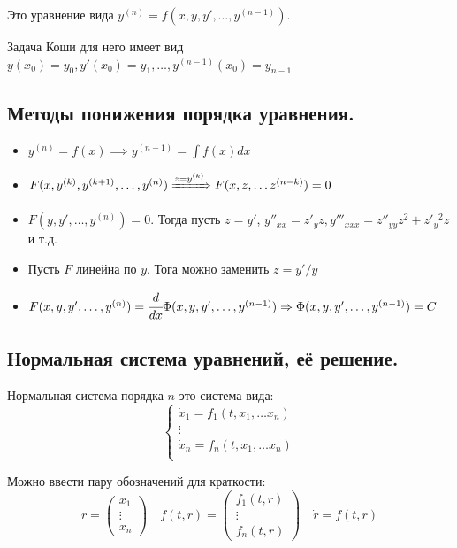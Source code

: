 Это уравнение вида \(y^{(n)} = f(x, y, y', \dots , y^{(n - 1)})\).

Задача Коши для него имеет вид \(y(x_0) = y_0, y'(x_0) = y_1, \dots , y^{(n - 1)}(x_0) = y_{n - 1}\)

\subsection*{Методы понижения порядка уравнения.}

\begin{itemize}
    \item \(y^{(n)} = f(x) \implies y^{(n - 1)} = \int f(x) dx\)
    \item \(F(x, y^{(k)}, y^{(k + 1)}, \dots , y^{(n)}) \xRightarrow{z = y^{(k)}} F(x, z, \dots z^{(n - k)}) = 0\)
    \item \(F(y, y', \dots , y^{(n)}) = 0\). Тогда пусть \(z = y'\), \(y''_{xx} = z'_y z, y'''_{x x x} = z''_{yy} z^2 + z'_y{^2} z\) и т.д.
    \item Пусть \(F\) линейна по \(y\). Тога можно заменить \(z = y'/y\)
    \item \(F(x, y, y', \dots , y^{(n)}) = \cfrac{d}{dx} \Phi(x, y, y', \dots , y^{(n - 1)}) \Rightarrow \Phi(x, y, y', \dots , y^{(n - 1)}) = C\)
\end{itemize}

\subsection*{Нормальная система уравнений, её решение.}

Нормальная система порядка \(n\) это система вида:
\[\begin{cases}
        \dot{x}_1 = f_1(t, x_1, \dots x_n) \\
        \vdots                             \\
        \dot{x}_n = f_n(t, x_1, \dots x_n) \\
    \end{cases}\]

Можно ввести пару обозначений для краткости:
\[r = \begin{pmatrix} x_1 \\ \vdots \\ x_n \end{pmatrix} \quad f(t, r) = \begin{pmatrix} f_1(t, r) \\ \vdots \\ f_n(t, r) \end{pmatrix} \quad \dot{r} = f(t, r)\]

